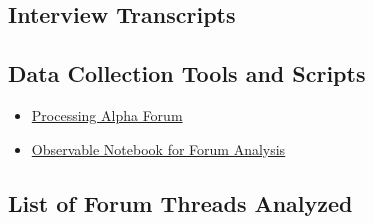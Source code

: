 \documentclass{article}
\begin{document}
\subsection{Interview Transcripts}


\subsection{Data Collection Tools and Scripts}

\begin{itemize}
    \item \href{https://forum.processing.org/alpha/}{Processing Alpha Forum}
    \item \href{https://observablehq.com/d/042b1cf42ea9bb5e}{Observable Notebook for Forum Analysis}
\end{itemize}


\subsection{List of Forum Threads Analyzed}
\end{document}
